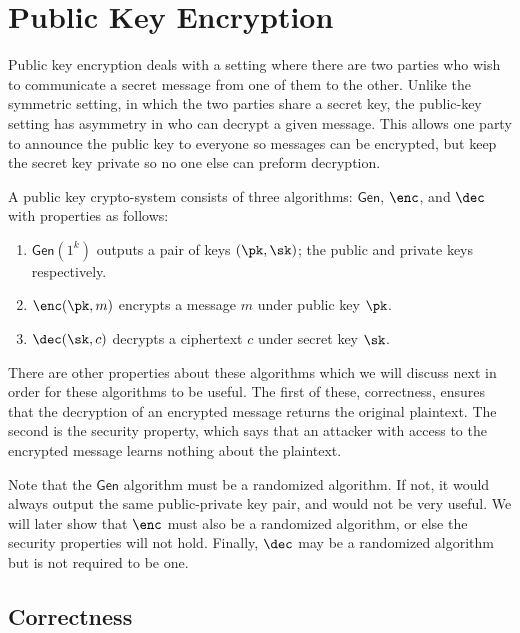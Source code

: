 \documentclass[12pt]{tufte-book}
\newcommand{\gen}{\mathsf{Gen}}
\begin{document}

\newcommand{\fake}{\mathsf{FAKE}}

\chapter{Public Key Encryption}
Public key encryption deals with a setting where there are two parties who wish
to communicate a secret message from one of them to the other. Unlike the symmetric
setting, in which the two parties share a secret key, the public-key setting has
asymmetry in who can decrypt a given message. This allows one party to
announce the public key to everyone so messages can be encrypted, but keep the
secret key private so no one else can preform decryption.

\begin{definition}

A public key crypto-system consists of three algorithms: $\gen$, $\enc$,
and $\dec$ with properties as follows:

\begin{enumerate}
\item $\gen(1^k)$ outputs a pair of keys $(\pk, \sk)$; the public and private
keys respectively.

\item $\enc(\pk, m)$ encrypts a message $m$ under
public key $\pk$.

\item $\dec(\sk, c)$ decrypts a ciphertext $c$
under secret key $\sk$.
\end{enumerate}
\end{definition}

There are other properties about these algorithms which we will discuss next
in order for these algorithms to be useful. The first of these, correctness,
ensures that the decryption of an encrypted message returns the original plaintext.
The second is the security property, which says that an attacker with access
to the encrypted message learns nothing about the plaintext.

Note that the $\gen$ algorithm must be a randomized algorithm. If not, it would
always output the same public-private key pair, and would not be very useful. We will
later show that $\enc$ must also be a randomized algorithm, or else the security
properties will not hold. Finally, $\dec$ may be a randomized algorithm but is not
required to be one.


\section{Correctness}
\end{document}
